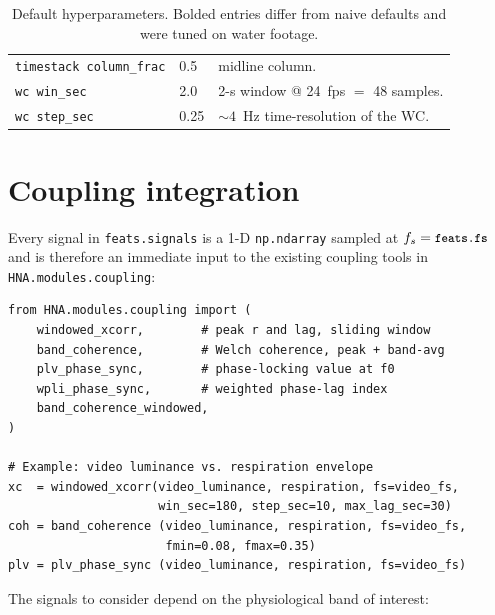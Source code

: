 \documentclass[11pt,a4paper]{article}
\newcommand{\code}[1]{\texttt{\small #1}}
\begin{document}
\begin{table}[ht]
\begin{tabular}{@{}lll@{}}
\code{timestack column\_frac}            & 0.5                     & midline column.                          \\
\code{wc win\_sec}                       & 2.0                     & 2-s window @ 24~fps $=$ 48 samples.      \\
\code{wc step\_sec}                      & 0.25                    & $\sim$$4$~Hz time-resolution of the WC.  \\
\bottomrule
\end{tabular}
\caption{Default hyperparameters. Bolded entries differ from naive defaults
and were tuned on water footage.}
\label{tab:hp}
\end{table}

\section{Coupling integration}\label{sec:coupling}

Every signal in \code{feats.signals} is a 1-D \code{np.ndarray} sampled at
$f_s = \code{feats.fs}$ and is therefore an immediate input to the
existing coupling tools in \code{HNA.modules.coupling}:

\begin{lstlisting}
from HNA.modules.coupling import (
    windowed_xcorr,        # peak r and lag, sliding window
    band_coherence,        # Welch coherence, peak + band-avg
    plv_phase_sync,        # phase-locking value at f0
    wpli_phase_sync,       # weighted phase-lag index
    band_coherence_windowed,
)

# Example: video luminance vs. respiration envelope
xc  = windowed_xcorr(video_luminance, respiration, fs=video_fs,
                     win_sec=180, step_sec=10, max_lag_sec=30)
coh = band_coherence (video_luminance, respiration, fs=video_fs,
                      fmin=0.08, fmax=0.35)
plv = plv_phase_sync (video_luminance, respiration, fs=video_fs)
\end{lstlisting}

The signals to consider depend on the physiological band of interest:
\end{document}
